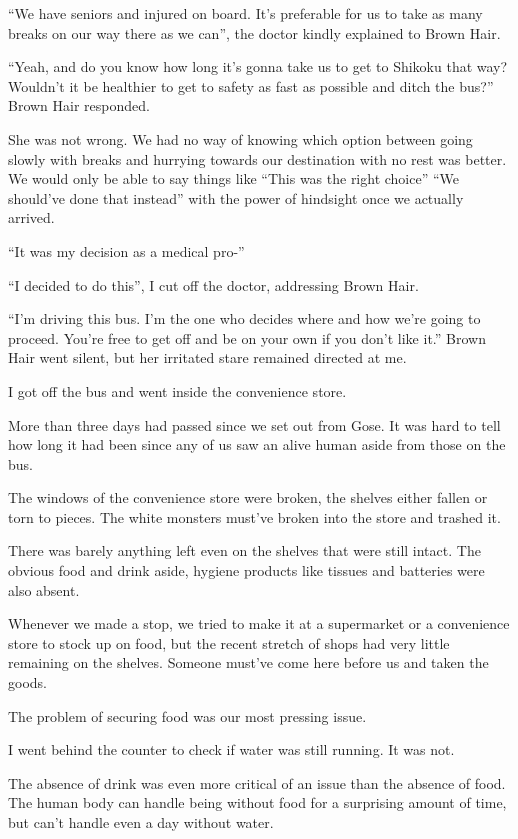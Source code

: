 ``We have seniors and injured on board. It's preferable for us to take as many breaks on our way there as we can'', the doctor kindly explained to Brown Hair.

``Yeah, and do you know how long it's gonna take us to get to Shikoku that way? Wouldn't it be healthier to get to safety as fast as possible and ditch the bus?'' Brown Hair responded.

She was not wrong. We had no way of knowing which option between going slowly with breaks and hurrying towards our destination with no rest was better. We would only be able to say things like ``This was the right choice'' ``We should've done that instead'' with the power of hindsight once we actually arrived.

``It was my decision as a medical pro-''

``I decided to do this'', I cut off the doctor, addressing Brown Hair.

``I'm driving this bus. I'm the one who decides where and how we're going to proceed. You're free to get off and be on your own if you don't like it.''  Brown Hair went silent, but her irritated stare remained directed at me.

I got off the bus and went inside the convenience store.

More than three days had passed since we set out from Gose. It was hard to tell how long it had been since any of us saw an alive human aside from those on the bus.

The windows of the convenience store were broken, the shelves either fallen or torn to pieces. The white monsters must've broken into the store and trashed it.

There was barely anything left even on the shelves that were still intact. The obvious food and drink aside, hygiene products like tissues and batteries were also absent.

Whenever we made a stop, we tried to make it at a supermarket or a convenience store to stock up on food, but the recent stretch of shops had very little remaining on the shelves. Someone must've come here before us and taken the goods.

The problem of securing food was our most pressing issue.

I went behind the counter to check if water was still running. It was not.

The absence of drink was even more critical of an issue than the absence of food. The human body can handle being without food for a surprising amount of time, but can't handle even a day without water.

